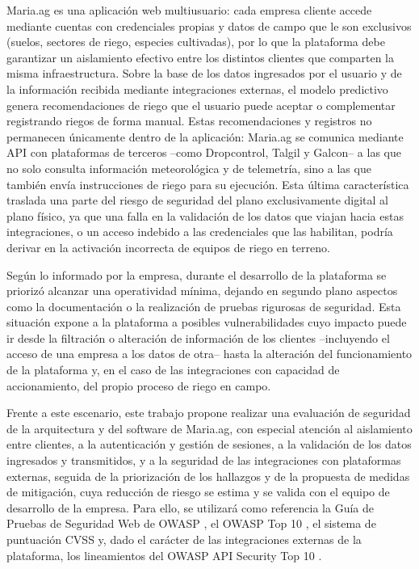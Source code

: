 \documentclass[12pt,letterpaper]{report}
\begin{document}
Maria.ag es una aplicación web multiusuario: cada empresa cliente accede
mediante cuentas con credenciales propias y datos de campo que le son
exclusivos (suelos, sectores de riego, especies cultivadas), por lo que la
plataforma debe garantizar un aislamiento efectivo entre los distintos
clientes que comparten la misma infraestructura. Sobre la base de los datos
ingresados por el usuario y de la información recibida mediante integraciones
externas, el modelo predictivo genera recomendaciones de riego que el usuario
puede aceptar o complementar registrando riegos de forma manual. Estas
recomendaciones y registros no permanecen únicamente dentro de la aplicación:
Maria.ag se comunica mediante API con plataformas de terceros --como
Dropcontrol, Talgil y Galcon-- a las que no solo consulta información
meteorológica y de telemetría, sino a las que también envía instrucciones de
riego para su ejecución. Esta última característica traslada una parte del
riesgo de seguridad del plano exclusivamente digital al plano físico, ya que
una falla en la validación de los datos que viajan hacia estas integraciones,
o un acceso indebido a las credenciales que las habilitan, podría derivar en
la activación incorrecta de equipos de riego en terreno.

Según lo informado por la empresa, durante el desarrollo de la plataforma se
priorizó alcanzar una operatividad mínima, dejando en segundo plano aspectos
como la documentación o la realización de pruebas rigurosas de seguridad.
Esta situación expone a la plataforma a posibles vulnerabilidades cuyo
impacto puede ir desde la filtración o alteración de información de los
clientes --incluyendo el acceso de una empresa a los datos de otra-- hasta la
alteración del funcionamiento de la plataforma y, en el caso de las
integraciones con capacidad de accionamiento, del propio proceso de riego en
campo.

Frente a este escenario, este trabajo propone realizar una evaluación de
seguridad de la arquitectura y del software de Maria.ag, con especial
atención al aislamiento entre clientes, a la autenticación y gestión de
sesiones, a la validación de los datos ingresados y transmitidos, y a la
seguridad de las integraciones con plataformas externas, seguida de la
priorización de los hallazgos y de la propuesta de medidas de mitigación, cuya
reducción de riesgo se estima y se valida con el equipo de desarrollo de la
empresa. Para ello, se utilizará como referencia la Guía de Pruebas de
Seguridad Web de OWASP \autocite{owasp2024wstg}, el OWASP Top 10
\autocite{owasp2025top10}, el sistema de puntuación CVSS
\autocite{first2023cvss} y, dado el carácter de las integraciones externas de
la plataforma, los lineamientos del OWASP API Security Top 10
\autocite{owasp2023api}.
\end{document}

